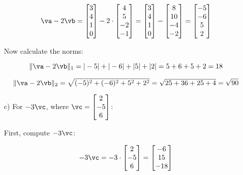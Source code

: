 \begin{sol}
\begin{enumerate}
        \[
        \va - 2\vb = \begin{bmatrix} 3 \\ 4 \\ 1 \\ 0 \end{bmatrix} - 2 \cdot \begin{bmatrix} 4 \\ 5 \\ -2 \\ -1 \end{bmatrix} = \begin{bmatrix} 3 \\ 4 \\ 1 \\ 0 \end{bmatrix} - \begin{bmatrix} 8 \\ 10 \\ -4 \\ -2 \end{bmatrix} = \begin{bmatrix} -5 \\ -6 \\ 5 \\ 2 \end{bmatrix}
        \]
        
        Now calculate the norms:
        
        \[
        \|\va - 2\vb\|_1 = |-5| + |-6| + |5| + |2| = 5 + 6 + 5 + 2 = 18
        \]
        
        \[
        \|\va - 2\vb\|_2 = \sqrt{(-5)^2 + (-6)^2 + 5^2 + 2^2} = \sqrt{25 + 36 + 25 + 4} = \sqrt{90}
        \]
        
        \item[c)] For $-3\vc$, where $\vc= \begin{bmatrix} 2 \\ -5 \\ 6 \end{bmatrix}$:
        
        First, compute $-3\vc$:
        
        \[
        -3\vc = -3 \cdot \begin{bmatrix} 2 \\ -5 \\ 6 \end{bmatrix} = \begin{bmatrix} -6 \\ 15 \\ -18 \end{bmatrix}
        \]
        

\end{enumerate}
\end{sol}
